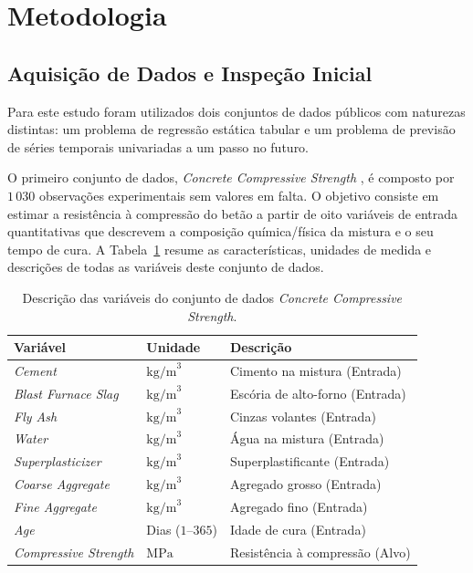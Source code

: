 \documentclass[conference]{IEEEtran}
\begin{document}
\section{Metodologia}

\subsection{Aquisição de Dados e Inspeção Inicial}

Para este estudo foram utilizados dois conjuntos de dados públicos com naturezas distintas: um problema de regressão estática tabular e um problema de previsão de séries temporais univariadas a um passo no futuro.

O primeiro conjunto de dados, \textit{Concrete Compressive Strength} \cite{b2, b3}, é composto por $1\,030$ observações experimentais sem valores em falta. O objetivo consiste em estimar a resistência à compressão do betão a partir de oito variáveis de entrada quantitativas que descrevem a composição química/física da mistura e o seu tempo de cura. A Tabela~\ref{tab:concrete_vars} resume as características, unidades de medida e descrições de todas as variáveis deste conjunto de dados.

\begin{table}[htbp]
\caption{Descrição das variáveis do conjunto de dados \textit{Concrete Compressive Strength}.}
\label{tab:concrete_vars}
\centering
\scriptsize
\begin{tabular}{@{}lll@{}}
\toprule
\textbf{Variável} & \textbf{Unidade} & \textbf{Descrição} \\
\midrule
\textit{Cement} & $\text{kg/m}^3$ & Cimento na mistura (Entrada)\\
\textit{Blast Furnace Slag} & $\text{kg/m}^3$ & Escória de alto-forno (Entrada)\\
\textit{Fly Ash} & $\text{kg/m}^3$ & Cinzas volantes (Entrada)\\
\textit{Water} & $\text{kg/m}^3$ & Água na mistura (Entrada)\\
\textit{Superplasticizer} & $\text{kg/m}^3$ & Superplastificante (Entrada)\\
\textit{Coarse Aggregate} & $\text{kg/m}^3$ & Agregado grosso (Entrada)\\
\textit{Fine Aggregate} & $\text{kg/m}^3$ & Agregado fino (Entrada)\\
\textit{Age} & Dias ($1\text{--}365$) & Idade de cura (Entrada)\\
\textit{Compressive Strength} & $\text{MPa}$ & Resistência à compressão (Alvo)\\
\bottomrule
\end{tabular}
\end{table}
\end{document}
